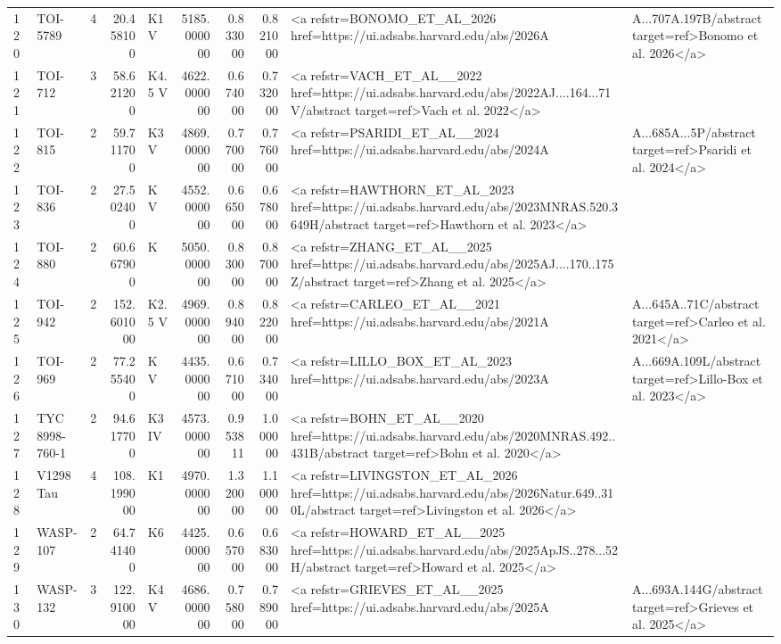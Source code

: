 \begin{tabular}{llrrlrrrl}
120 & TOI-5789 & 4 & 20.458100 & K1 V & 5185.000000 & 0.833000 & 0.821000 & <a refstr=BONOMO_ET_AL_2026 href=https://ui.adsabs.harvard.edu/abs/2026A&A...707A.197B/abstract target=ref>Bonomo et al. 2026</a> \\
121 & TOI-712 & 3 & 58.621200 & K4.5 V & 4622.000000 & 0.674000 & 0.732000 & <a refstr=VACH_ET_AL__2022 href=https://ui.adsabs.harvard.edu/abs/2022AJ....164...71V/abstract target=ref>Vach et al. 2022</a> \\
122 & TOI-815 & 2 & 59.711700 & K3 V & 4869.000000 & 0.770000 & 0.776000 & <a refstr=PSARIDI_ET_AL__2024 href=https://ui.adsabs.harvard.edu/abs/2024A&A...685A...5P/abstract target=ref>Psaridi et al. 2024</a> \\
123 & TOI-836 & 2 & 27.502400 & K V & 4552.000000 & 0.665000 & 0.678000 & <a refstr=HAWTHORN_ET_AL_2023 href=https://ui.adsabs.harvard.edu/abs/2023MNRAS.520.3649H/abstract target=ref>Hawthorn et al. 2023</a> \\
124 & TOI-880 & 2 & 60.667900 & K & 5050.000000 & 0.830000 & 0.870000 & <a refstr=ZHANG_ET_AL__2025 href=https://ui.adsabs.harvard.edu/abs/2025AJ....170..175Z/abstract target=ref>Zhang et al. 2025</a> \\
125 & TOI-942 & 2 & 152.601000 & K2.5 V & 4969.000000 & 0.894000 & 0.822000 & <a refstr=CARLEO_ET_AL__2021 href=https://ui.adsabs.harvard.edu/abs/2021A&A...645A..71C/abstract target=ref>Carleo et al. 2021</a> \\
126 & TOI-969 & 2 & 77.255400 & K V & 4435.000000 & 0.671000 & 0.734000 & <a refstr=LILLO_BOX_ET_AL_2023 href=https://ui.adsabs.harvard.edu/abs/2023A&A...669A.109L/abstract target=ref>Lillo-Box et al. 2023</a> \\
127 & TYC 8998-760-1 & 2 & 94.617700 & K3 IV & 4573.000000 & 0.953811 & 1.000000 & <a refstr=BOHN_ET_AL__2020 href=https://ui.adsabs.harvard.edu/abs/2020MNRAS.492..431B/abstract target=ref>Bohn et al. 2020</a> \\
128 & V1298 Tau & 4 & 108.199000 & K1 & 4970.000000 & 1.320000 & 1.100000 & <a refstr=LIVINGSTON_ET_AL_2026 href=https://ui.adsabs.harvard.edu/abs/2026Natur.649..310L/abstract target=ref>Livingston et al. 2026</a> \\
129 & WASP-107 & 2 & 64.741400 & K6 & 4425.000000 & 0.657000 & 0.683000 & <a refstr=HOWARD_ET_AL__2025 href=https://ui.adsabs.harvard.edu/abs/2025ApJS..278...52H/abstract target=ref>Howard et al. 2025</a> \\
130 & WASP-132 & 3 & 122.910000 & K4 V & 4686.000000 & 0.758000 & 0.789000 & <a refstr=GRIEVES_ET_AL__2025 href=https://ui.adsabs.harvard.edu/abs/2025A&A...693A.144G/abstract target=ref>Grieves et al. 2025</a> \\

\end{tabular}

